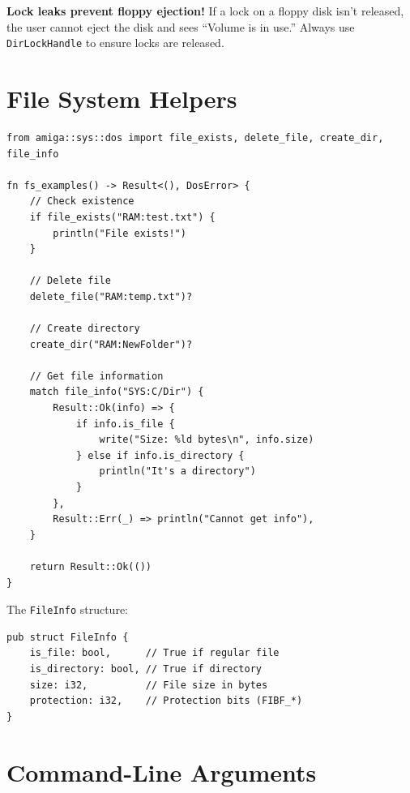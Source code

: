 \begin{warningbox}
\textbf{Lock leaks prevent floppy ejection!} If a lock on a floppy disk isn't released, the user cannot eject the disk and sees ``Volume is in use.'' Always use \texttt{DirLockHandle} to ensure locks are released.
\end{warningbox}

\section{File System Helpers}
\label{sec:fs-helpers}

\begin{lstlisting}
from amiga::sys::dos import file_exists, delete_file, create_dir, file_info

fn fs_examples() -> Result<(), DosError> {
    // Check existence
    if file_exists("RAM:test.txt") {
        println("File exists!")
    }

    // Delete file
    delete_file("RAM:temp.txt")?

    // Create directory
    create_dir("RAM:NewFolder")?

    // Get file information
    match file_info("SYS:C/Dir") {
        Result::Ok(info) => {
            if info.is_file {
                write("Size: %ld bytes\n", info.size)
            } else if info.is_directory {
                println("It's a directory")
            }
        },
        Result::Err(_) => println("Cannot get info"),
    }

    return Result::Ok(())
}
\end{lstlisting}

The \texttt{FileInfo} structure:

\begin{lstlisting}
pub struct FileInfo {
    is_file: bool,      // True if regular file
    is_directory: bool, // True if directory
    size: i32,          // File size in bytes
    protection: i32,    // Protection bits (FIBF_*)
}
\end{lstlisting}

\section{Command-Line Arguments}
\label{sec:args}

